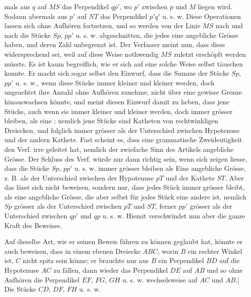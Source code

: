 mals aus $q$ auf $MS$ das Perpendikel $qp'$, wo $p'$ zwischen $p$ und $M$
liegen wird. Sodann abermals aus $p'$ auf $NT$ das Perpendikel $p'q'$ u. s. w.
Diese Operationen lassen sich ohne Aufhören fortsetzen, und so werden von der
Linie $MS$ nach und nach die Stücke $Sp$, $pp'$ u. s. w. abgeschnitten, die jedes
eine angebliche Grösse haben, und deren Zahl unbegrenzt ist. Der Verfasser meint
nun, dass diess widersprechend sei, weil auf diese Weise nothwendig $MS$ zuletzt
erschöpft werden müsste. Es ist kaum begreiflich, wie er sich auf eine solche
Weise selbst täuschen konnte. Er macht sich sogar selbst den Einwurf, dass die
Summe der Stücke $Sp$, $pp'$ u. s. w., wenn diese Stücke immer kleiner und
kleiner werden, doch ungeachtet ihre Anzahl ohne Aufhören zunehme, nicht über
eine gewisse Grenze hinauswachsen könnte, und meint diesen Einwurf damit zu
heben, dass jene Stücke, auch wenn sie immer kleiner und kleiner werden, doch
  immer grösser bleiben, als eine ; nemlich jene Stücke
sind Katheten von rechtwinkligen Dreiecken, und folglich immer grösser als der
Unterschied zwischen Hypotenuse und der andern Kathete. Fast scheint es, dass
eine grammatische Zweideutigkeit den Verf. irre geleitet hat, nemlich der
  zwiefache Sinn des Artikels  angebliche Grösse. Der Schluss des
Verf. würde nur dann richtig sein, wenn sich zeigen liesse, dass die Stücke $Sp$,
  $pp'$ u. s. w. immer grösser bleiben als Eine  angebliche
  Grösse, z. B. als der Unterschied zwischen der Hypotenuse $pT$ und der Kathete
$ST$. Aber das lässt sich nicht beweisen, sondern nur, dass jedes Stück immer
grösser bleibt, als eine angebliche Grösse, die aber selbst für jedes Stück eine
andere ist, nemlich $Sp$ grösser als der Unterschied zwischen $pT$ und $ST$,
ferner $pp'$ grösser als der Unterschied zwischen $qp'$ und $qp$ u. s. w.
Hiemit verschwindet nun aber die ganze Kraft des Beweises.

\begin{center}\end{center}

Auf dieselbe Art, wie er seinen Beweis führen zu können geglaubt hat, könnte er
auch beweisen, dass in einem ebenen Dreiecke $ABC$, worin $B$ ein rechter Winkel
ist, $C$ nicht spitz sein könne; er brauchte nur aus $B$ ein Perpendikel $BD$ auf
die Hypotenuse $AC$ zu fällen, dann wieder das Perpendikel $DE$ auf $AB$ und so
ohne Aufhören die Perpendikel $EF$, $FG$, $GH$ u. s. w. wechselsweise auf $AC$
und $AB$.] Die Stücke $CD$, $DF$, $FH$ u. s. w.
